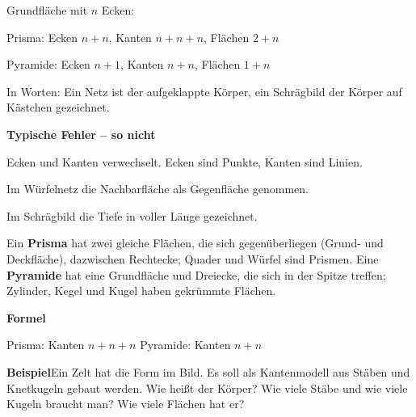 \documentclass[11pt]{article}
\newcommand{\nr}[1]{\makebox[7mm][l]{\textbf{#1}}}
\newlength{\kr}
\begin{document}
\begin{tcolorbox}[colback=mbkasten,colframe=mbgrau,boxrule=0.5pt,arc=1mm,left=3mm,right=3mm,top=2mm,bottom=2mm,title={\bfseries Formel auf einen Blick},coltitle=black,colbacktitle=black!10]
{\Large Grundfläche mit $n$ Ecken:\par Prisma: Ecken $n + n$, Kanten $n + n + n$, Flächen $2 + n$\par Pyramide: Ecken $n + 1$, Kanten $n + n$, Flächen $1 + n$}\par\medskip
In Worten: Ein Netz ist der aufgeklappte Körper, ein Schrägbild der Körper auf Kästchen gezeichnet.\par\medskip
\end{tcolorbox}
\medskip\noindent\textbf{Typische Fehler – so nicht}\par\smallskip
\noindent\nr{$\times$}Ecken und Kanten verwechselt. Ecken sind Punkte, Kanten sind Linien.\par
\noindent\nr{$\times$}Im Würfelnetz die Nachbarfläche als Gegenfläche genommen.\par
\noindent\nr{$\times$}Im Schrägbild die Tiefe in voller Länge gezeichnet.\par
\clearpage\label{s:A}\noindent\colorbox{black!12}{}\hspace{3mm}{\Large\bfseries Körper erkennen und zählen}\par\smallskip
\noindent Ein \textbf{Prisma} hat zwei gleiche Flächen, die sich gegenüberliegen (Grund- und Deckfläche), dazwischen Rechtecke; Quader und Würfel sind Prismen. Eine \textbf{Pyramide} hat eine Grundfläche und Dreiecke, die sich in der Spitze treffen; Zylinder, Kegel und Kugel haben gekrümmte Flächen.\par\medskip
\noindent\textbf{Formel}\par\nopagebreak\noindent\hspace*{4mm}\begin{minipage}{\dimexpr\linewidth-4mm\relax}Prisma: Kanten $n + n + n$ \qquad Pyramide: Kanten $n + n$ \end{minipage}\par\medskip
\noindent\textbf{Beispiel}\quad Ein Zelt hat die Form im Bild. Es soll als Kantenmodell aus Stäben und Knetkugeln gebaut werden. Wie heißt der Körper? Wie viele Stäbe und wie viele Kugeln braucht man? Wie viele Flächen hat er?\par\smallskip
\end{document}
